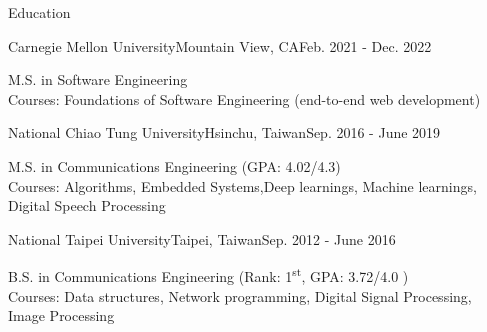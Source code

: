 \documentclass{resume_short} %
\newcommand{\ts}{\textsuperscript}
\begin{document}

\begin{rSection}{Education}
    \begin{rSubsection3}{ Carnegie Mellon University}{Mountain View, CA}{Feb. 2021 - Dec. 2022}
        \item {M.S. in Software Engineering} \\
         Courses: Foundations of Software Engineering (end-to-end web development)
    \end{rSubsection3}
    \begin{rSubsection3}{ National Chiao Tung University}{Hsinchu, Taiwan}{Sep. 2016 - June 2019}
        \item {M.S. in Communications Engineering (GPA: 4.02/4.3)} \\
        Courses: Algorithms, Embedded Systems,Deep learnings, Machine learnings, Digital Speech Processing
    \end{rSubsection3}
    \begin{rSubsection3}{ National Taipei University}{Taipei, Taiwan}{Sep. 2012 - June 2016}
        \item {B.S. in Communications Engineering (Rank: 1\ts{st}, GPA: 3.72/4.0 )} \\
        Courses: Data structures, Network programming, Digital Signal Processing, Image Processing
    \end{rSubsection3}
\end{rSection}

\end{document}
